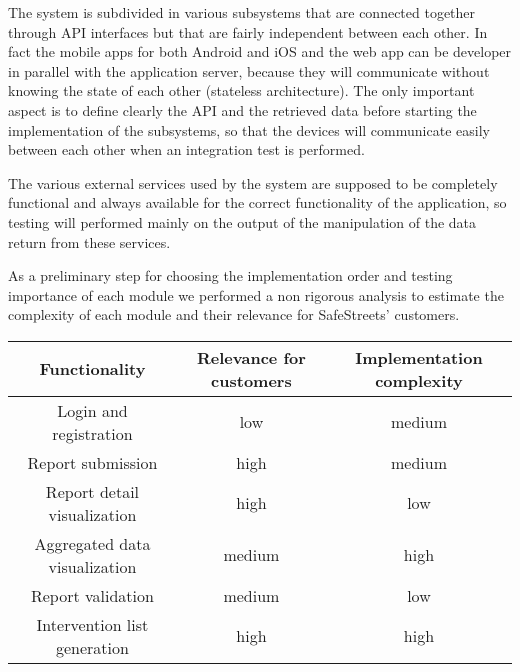 The system is subdivided in various subsystems that are connected together through API interfaces but that are fairly independent between each other. In fact the mobile apps for both Android and iOS and the web app can be developer in parallel with the application server, because they will communicate without knowing the state of each other (stateless architecture). The only important aspect is to define clearly the API and the retrieved data before starting the implementation of the subsystems, so that the devices will communicate easily between each other when an integration test is performed.

The various external services used by the system are supposed to be completely functional and always available for the correct functionality of the application, so testing will performed mainly on the output of the manipulation of the data return from these services.

As a preliminary step for choosing the implementation order and testing importance of each module we performed a non rigorous analysis to estimate the complexity of each module and their relevance for SafeStreets' customers.

\bigskip
\begin{tabular}{|c|c|c|}
	\hline 
	Functionality & Relevance for customers & Implementation complexity \\ 
	\hline
	\hline 
	Login and registration & low & medium \\ 
	\hline 
	Report submission & high & medium \\ 
	\hline 
	Report detail visualization & high & low \\ 
	\hline 
	Aggregated data visualization & medium & high \\ 
	\hline 
	Report validation & medium & low \\ 
	\hline 
	Intervention list generation & high & high \\  
	\hline 
\end{tabular} 